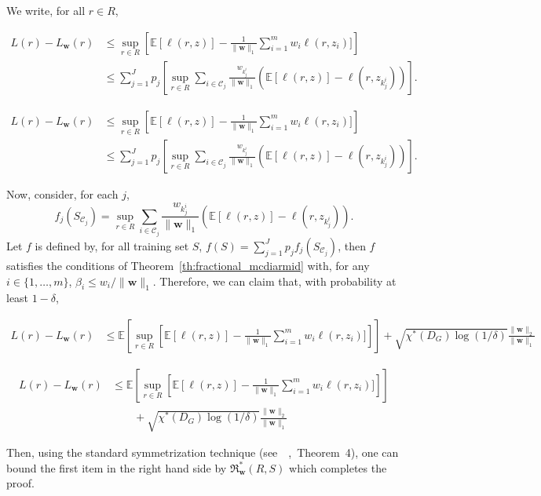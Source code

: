 \documentclass[letterpaper]{article} %
\def\DoubleColumn{}
\def\DoubleColumnEnd{}
\def\SingleColumn{}
\def\SingleColumnEnd{}
\newcommand{\E}{\mathbb{E}}
\newcommand{\weight}{\mathbf{w}}
\newcommand{\empiricalrisk}[1]{L_{#1}}
\newcommand{\risk}{L}
\newcommand{\normo}[1]{\|#1\|_1}
\newcommand{\fcoloring}{\chi^*}
\newcommand{\set}[1]{\{#1\}}
\newcommand{\citep}[3]{(#1\ \citeauthor{#3}\ \citeyear{#3},\ #2)}
\begin{document}
We write, for all $r\in R$,
\SingleColumn
\begin{equation}
  \label{eq:fractional_coloring_decomposition}
    \begin{aligned}
    \risk{}(r)-\empiricalrisk{\weight{}}(r)&\le \sup_{r\in R}\left[\E[\ell(r,z)] - \frac{1}{\normo{\weight{}}}\sum_{i=1}^m w_i\ell(r,z_i)]\right]\\
    &\le \sum_{j=1}^J p_j\left[ \sup_{r\in R}\sum_{i\in\mathcal{C}_j} \frac{w_{k_j^i}}{\normo{\weight{}}} (\E[\ell(r,z)] - \ell(r,z_{k_j^i}))\right].
    \end{aligned}
\end{equation}
\SingleColumnEnd
\DoubleColumn
\begin{equation}
  \label{eq:fractional_coloring_decomposition}
    \begin{aligned}
    \risk{}(r)-\empiricalrisk{\weight{}}(r)&\le \sup_{r\in R}\left[\E[\ell(r,z)] - \frac{1}{\normo{\weight{}}}\sum_{i=1}^m w_i\ell(r,z_i)]\right]\\
    &\le \sum_{j=1}^J p_j\left[ \sup_{r\in R}\sum_{i\in\mathcal{C}_j} \frac{w_{k_j^i}}{\normo{\weight{}}} (\E[\ell(r,z)] - \ell(r,z_{k_j^i}))\right].
    \end{aligned}
\end{equation}
\DoubleColumnEnd
Now, consider, for each $j$,
\[f_j(S_{\mathcal{C}_j}) = \sup_{r\in R}\sum_{i\in\mathcal{C}_j} \frac{w_{k_j^i}}{\normo{\weight{}}} (\E[\ell(r,z)] - \ell(r,z_{k_j^i})).\]
Let $f$ is defined by, for all training set $S$, $f(S)=\sum_{j=1}^Jp_jf_j(S_{\mathcal{C}_j})$, then $f$ satisfies the conditions of Theorem~\ref{th:fractional_mcdiarmid} with, for any $i\in \set{1,\dots,m}$, $\beta_i\le w_i/\normo{\weight{}}$. Therefore, we can claim that, with probability at least $1-\delta$,
\SingleColumn
\begin{align*}
  \risk{}(r) - \empiricalrisk{\weight{}}(r)&\le \E\left[\sup_{r\in R}\left[\E[\ell(r,z)] - \frac{1}{\normo{\weight{}}}\sum_{i=1}^m w_i\ell(r,z_i)]\right]\right] + \sqrt{\fcoloring(D_G)\log(1/\delta)}\frac{\|\weight{}\|_2}{\normo{\weight{}}}
\end{align*}
\SingleColumnEnd
\DoubleColumn
\begin{align*}
  \risk{}(r) - \empiricalrisk{\weight{}}(r)&\le \E\left[\sup_{r\in R}\left[\E[\ell(r,z)] - \frac{1}{\normo{\weight{}}}\sum_{i=1}^m w_i\ell(r,z_i)]\right]\right]\\
  &\qquad+ \sqrt{\fcoloring(D_G)\log(1/\delta)}\frac{\|\weight{}\|_2}{\normo{\weight{}}}
\end{align*}
\DoubleColumnEnd
Then, using the standard symmetrization technique \citep{see}{Theorem~4}{Usunier2005}, one can bound the first item in the right hand side by $\mathfrak{R}_{\weight{}}^*(R,S)$ which completes the proof. 
\end{document}
